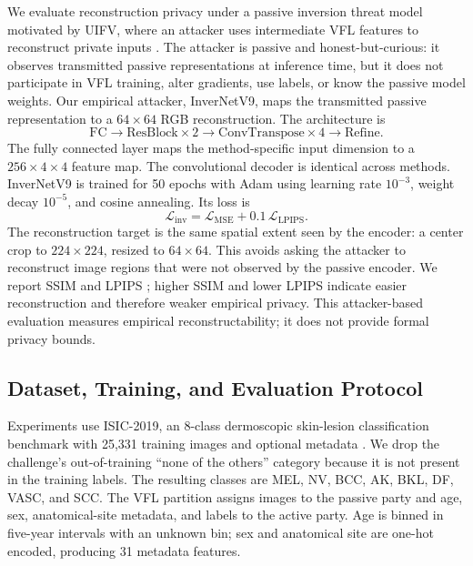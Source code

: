 \documentclass{article}
\begin{document}
We evaluate reconstruction privacy under a passive inversion threat model motivated by UIFV, where an attacker uses intermediate VFL features to reconstruct private inputs \citep{yang2024uifv}. The attacker is passive and honest-but-curious: it observes transmitted passive representations at inference time, but it does not participate in VFL training, alter gradients, use labels, or know the passive model weights. Our empirical attacker, InverNetV9, maps the transmitted passive representation to a $64 \times 64$ RGB reconstruction. The architecture is
\begin{equation}
\text{FC} \rightarrow \text{ResBlock} \times 2
\rightarrow \text{ConvTranspose} \times 4
\rightarrow \text{Refine}.
\end{equation}
The fully connected layer maps the method-specific input dimension to a $256 \times 4 \times 4$ feature map. The convolutional decoder is identical across methods. InverNetV9 is trained for 50 epochs with Adam using learning rate $10^{-3}$, weight decay $10^{-5}$, and cosine annealing. Its loss is
\begin{equation}
    \mathcal{L}_{\mathrm{inv}}
    =
    \mathcal{L}_{\mathrm{MSE}}
    + 0.1 \, \mathcal{L}_{\mathrm{LPIPS}}.
\end{equation}
The reconstruction target is the same spatial extent seen by the encoder: a center crop to $224 \times 224$, resized to $64 \times 64$. This avoids asking the attacker to reconstruct image regions that were not observed by the passive encoder. We report SSIM \citep{wang2004ssim} and LPIPS \citep{zhang2018lpips}; higher SSIM and lower LPIPS indicate easier reconstruction and therefore weaker empirical privacy. This attacker-based evaluation measures empirical reconstructability; it does not provide formal privacy bounds.

\subsection{Dataset, Training, and Evaluation Protocol}

Experiments use ISIC-2019, an 8-class dermoscopic skin-lesion classification benchmark with 25,331 training images and optional metadata \citep{isic2019challenge,combalia2022isic}. We drop the challenge's out-of-training ``none of the others'' category because it is not present in the training labels. The resulting classes are MEL, NV, BCC, AK, BKL, DF, VASC, and SCC. The VFL partition assigns images to the passive party and age, sex, anatomical-site metadata, and labels to the active party. Age is binned in five-year intervals with an unknown bin; sex and anatomical site are one-hot encoded, producing 31 metadata features.
\end{document}
